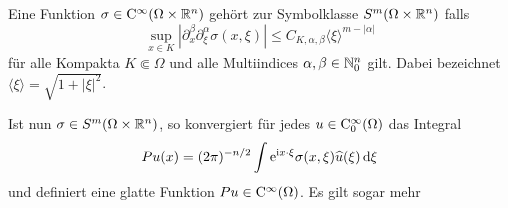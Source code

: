\begin{df}
Eine Funktion $\sigma\in\mathrm C^\infty(\Omega\times\mathbb R^n)$ gehört zur Symbolklasse $S^m(\Omega\times\mathbb R^n)$ falls
\begin{equation} 
  \sup_{x\in K}  |  \partial_x^\beta\partial_\xi^\alpha \sigma(x,\xi) | \le C_{K,\alpha,\beta} \langle\xi\rangle^{m-|\alpha|}
\end{equation}
für alle Kompakta $K\Subset\Omega$ und alle Multiindices $\alpha,\beta\in\mathbb N^n_0$ gilt. Dabei bezeichnet $\langle\xi\rangle = \sqrt{1+|\xi|^2}$.
\end{df}

Ist nun $\sigma\in S^m(\Omega\times\mathbb R^n)$, so konvergiert für jedes $u\in\mathrm C_0^\infty(\Omega)$ das Integral
\begin{equation}\label{eq:6:6.9}
   P u (x) = (2\pi)^{-n/2} \int \mathrm e^{\mathrm i x\cdot\xi} \sigma(x,\xi) \widehat u(\xi) \,\mathrm d\xi
\end{equation}
und definiert eine glatte Funktion $Pu\in\mathrm C^\infty(\Omega)$. Es gilt sogar mehr


